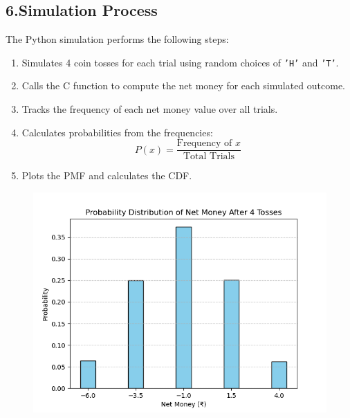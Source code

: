\documentclass[journal]{IEEEtran}
\numberwithin{equation}{enumi}
\numberwithin{figure}{enumi}
\begin{document}
\subsection*{6.Simulation Process}

The Python simulation performs the following steps:
\begin{enumerate}
    \item Simulates 4 coin tosses for each trial using random choices of \texttt{'H'} and \texttt{'T'}.
    \item Calls the C function to compute the net money for each simulated outcome.
    \item Tracks the frequency of each net money value over all trials.
    \item Calculates probabilities from the frequencies:
    \[
    P(x) = \frac{\text{Frequency of } x}{\text{Total Trials}}
    \]
    \item Plots the PMF and calculates the CDF.
\end{enumerate}

\begin{figure}[h!]
   \centering
   \includegraphics[width=0.7\linewidth]{figs/Figure_1.png}
\end{figure}
\end{document}
